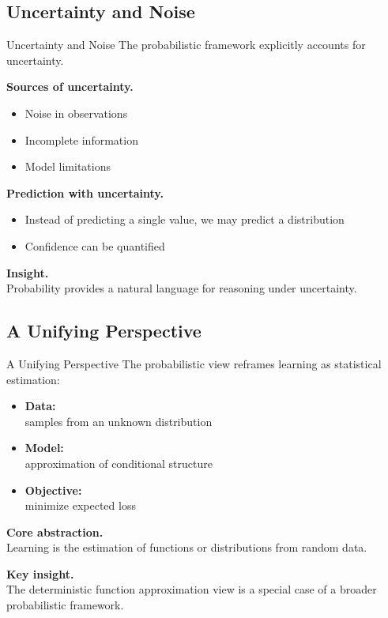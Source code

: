 \documentclass[aspectratio=169,11pt]{beamer}
\begin{document}
\subsection{Uncertainty and Noise}
\begin{frame}[t,allowframebreaks]{Uncertainty and Noise}
\small
The probabilistic framework explicitly accounts for uncertainty.

\textbf{Sources of uncertainty.}\\ \begin{itemize}
    \item Noise in observations
    \item Incomplete information
    \item Model limitations
\end{itemize}

\textbf{Prediction with uncertainty.}\\ \begin{itemize}
    \item Instead of predicting a single value, we may predict a distribution
    \item Confidence can be quantified
\end{itemize}

\textbf{Insight.}\\ Probability provides a natural language for reasoning under uncertainty.
\end{frame}

\subsection{A Unifying Perspective}
\begin{frame}[t,allowframebreaks]{A Unifying Perspective}
\small
The probabilistic view reframes learning as statistical estimation:

\begin{itemize}
    \item \textbf{Data:}\\ samples from an unknown distribution
    \item \textbf{Model:}\\ approximation of conditional structure
    \item \textbf{Objective:}\\ minimize expected loss
\end{itemize}

\textbf{Core abstraction.}\\ Learning is the estimation of functions or distributions from random data.

\textbf{Key insight.}\\ The deterministic function approximation view is a special case of a broader probabilistic framework.
\end{frame}
\end{document}
